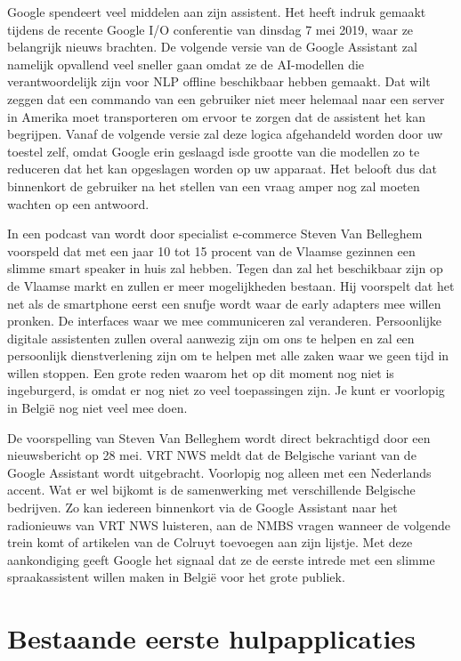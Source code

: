 Google spendeert veel middelen aan zijn assistent. Het heeft indruk gemaakt tijdens de recente Google I/O conferentie van dinsdag 7 mei 2019, waar ze belangrijk nieuws brachten. De volgende versie van de Google Assistant zal namelijk opvallend veel sneller gaan omdat ze de \gls{AI}-modellen die verantwoordelijk zijn voor \gls{NLP} offline beschikbaar hebben gemaakt. Dat wilt zeggen dat een commando van een gebruiker niet meer helemaal naar een server in Amerika moet transporteren om ervoor te zorgen dat de assistent het kan begrijpen. Vanaf de volgende versie zal deze logica afgehandeld worden door uw toestel zelf, omdat Google erin geslaagd isde grootte van die modellen zo te reduceren dat het kan opgeslagen worden op uw apparaat. Het belooft dus dat binnenkort de gebruiker na het stellen van een vraag amper nog zal moeten wachten op een antwoord.

In een podcast van \textcite{Belghmidi2019a} wordt door specialist e-commerce Steven Van Belleghem voorspeld dat met een jaar 10 tot 15 procent van de Vlaamse gezinnen een slimme smart speaker in huis zal hebben. Tegen dan zal het beschikbaar zijn op de Vlaamse markt en zullen er meer mogelijkheden bestaan. Hij voorspelt dat het net als de smartphone eerst een snufje wordt waar de early adapters mee willen pronken. De interfaces waar we mee communiceren zal veranderen. Persoonlijke digitale assistenten zullen overal aanwezig zijn om ons te helpen en zal een persoonlijk dienstverlening zijn om te helpen met alle zaken waar we geen tijd in willen stoppen.
Een grote reden waarom het op dit moment nog niet is ingeburgerd, is omdat er nog niet zo veel toepassingen zijn. Je kunt er voorlopig in België nog niet veel mee doen.

De voorspelling van Steven Van Belleghem wordt direct bekrachtigd door een nieuwsbericht op 28 mei. VRT NWS meldt dat de Belgische variant van de Google Assistant wordt uitgebracht. \autocite{Belghmidi2019} Voorlopig nog alleen met een Nederlands accent. Wat er wel bijkomt is de samenwerking met verschillende Belgische bedrijven. Zo kan iedereen binnenkort via de Google Assistant naar het radionieuws van VRT NWS luisteren, aan de NMBS vragen wanneer de volgende trein komt of artikelen van de Colruyt toevoegen aan zijn lijstje. Met deze aankondiging geeft Google het signaal dat ze de eerste intrede met een slimme spraakassistent willen maken in België voor het grote publiek.

\section{Bestaande eerste hulpapplicaties}
